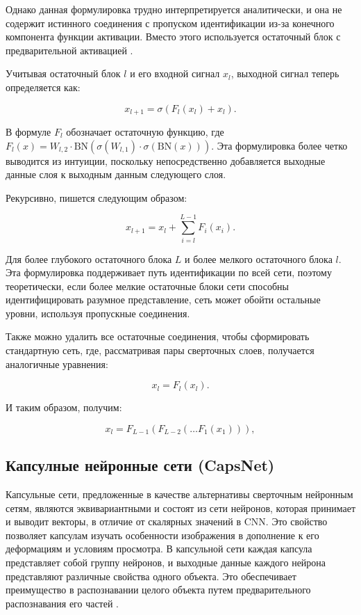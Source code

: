 Однако данная формулировка трудно интерпретируется аналитически, и она не содержит истинного соединения с пропуском идентификации из-за конечного компонента функции активации. Вместо этого используется остаточный блок с предварительной активацией \cite{he2016identity}. 

Учитывая остаточный блок \(l\) и его входной сигнал \(x_{l}\), выходной сигнал теперь определяется как:

\begin{equation}
    x_{l + 1} = \sigma(F_{l}(x_{l}) + x_{l}).
\end{equation}

В формуле \(F_{l}\) обозначает остаточную функцию, где \(F_{l}(x) = W_{l,2} \cdot \text{BN}(\sigma(W_{l,1}) \cdot \sigma(\text{BN}(x)))\). Эта формулировка более четко выводится из интуиции, поскольку непосредственно добавляется выходные данные слоя к выходным данным следующего слоя.

Рекурсивно, пишется следующим образом:

\begin{equation}
    x_{l + 1} = x_{l} + \sum_{i = l}^{L - 1} F_{i}(x_{i}).
\end{equation}

Для более глубокого остаточного блока \(L\) и более мелкого остаточного блока \(l\). Эта формулировка поддерживает путь идентификации по всей сети, поэтому теоретически, если более мелкие остаточные блоки сети способны идентифицировать разумное представление, сеть может обойти остальные уровни, используя пропускные соединения.

Также можно удалить все остаточные соединения, чтобы сформировать стандартную сеть, где, рассматривая пары сверточных слоев, получается аналогичные уравнения:

\begin{equation}
    x_{l} = F_{l}(x_{l}).
\end{equation}

И таким образом, получим:

\begin{equation}
    x_{l} = F_{L - 1}(F_{L - 2}(\ldots F_{1}(x_{1})))
, \end{equation}

\subsection{Капсулные нейронные сети (CapsNet)}

Капсульные сети, предложенные в качестве альтернативы сверточным нейронным сетям, являются эквивариантными и состоят из сети нейронов, которая принимает и выводит векторы, в отличие от скалярных значений в CNN. Это свойство позволяет капсулам изучать особенности изображения в дополнение к его деформациям и условиям просмотра. В капсульной сети каждая капсула представляет собой группу нейронов, и выходные данные каждого нейрона представляют различные свойства одного объекта. Это обеспечивает преимущество в распознавании целого объекта путем предварительного распознавания его частей \cite{lecun2015deep}.

